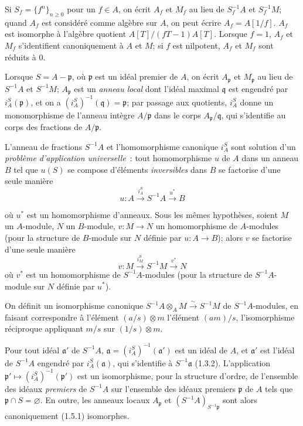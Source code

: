 \begin{env}[1.2.3]
\label{0.1.2.3-fr}
Si $S_f=\{f^n\}_{n\geq 0}$ pour un $f\in A$, on écrit $A_f$ et $M_f$ au lieu de $S_f^{-1}A$ et $S_f^{-1}M$; quand $A_f$ est considéré comme algèbre sur $A$, on peut écrire $A_f=A[1/f]$.
$A_f$ est isomorphe à l'algèbre quotient $A[T]/(fT-1)A[T]$.
Lorsque $f=1$, $A_f$ et $M_f$ s'identifient canoniquement à $A$ et $M$; si $f$ est nilpotent, $A_f$ et $M_f$ sont réduits à $0$.

Lorsque $S=A-\mathfrak{p}$, où $\mathfrak{p}$ est un idéal premier de $A$, on écrit $A_{\mathfrak{p}}$ et $M_{\mathfrak{p}}$ au lieu de $S^{-1}A$ et $S^{-1}M$; $A_{\mathfrak{p}}$ est un \emph{anneau local} dont l'idéal maximal $\mathfrak{q}$ est engendré par $i_A^S(\mathfrak{p})$, et on a $(i_A^S)^{-1}(\mathfrak{q})=\mathfrak{p}$; par passage aux quotients, $i_A^S$ donne un monomorphisme de l'anneau intègre $A/\mathfrak{p}$ dans le corps $A_{\mathfrak{p}}/\mathfrak{q}$, qui s'identifie au corps des fractions de $A/\mathfrak{p}$.
\end{env}

\begin{env}[1.2.4]
\label{0.1.2.4-fr}
L'anneau de fractions $S^{-1}A$ et l'homomorphisme canonique $i_A^S$ sont solution d'un \emph{problème d'application universelle}~: tout homomorphisme $u$ de $A$ dans un anneau $B$ tel que $u(S)$ se compose d'éléments \emph{inversibles} dans $B$ se factorise d'une seule manière
\[
  u:A\xrightarrow{i_A^S}S^{-1}A\xrightarrow{u^*}B
\]

où $u^*$ est un homomorphisme d'anneaux.
Sous les mêmes hypothèses, soient $M$ un $A$-module, $N$ un $B$-module, $v:M\to N$ un homomorphisme de $A$-modules (pour la structure de $B$-module sur $N$ définie par $u:A\to B$); alors $v$ se factorise d'une seule manière
\[
  v:M\xrightarrow{i_M^S}S^{-1}M\xrightarrow{v^*}N
\]
où $v^*$ est un homomorphisme de $S^{-1}A$-modules (pour la structure de $S^{-1}A$-module sur $N$ définie par $u^*$).
\end{env}

\begin{env}[1.2.5]
\label{0.1.2.5-fr}
On définit un isomorphisme canonique $S^{-1}A\otimes_A M\xrightarrow{\sim}S^{-1}M$ de $S^{-1}A$-modules, en faisant correspondre à l'élément $(a/s)\otimes m$ l'élément $(am)/s$, l'isomorphisme réciproque appliquant $m/s$ sur $(1/s)\otimes m$.
\end{env}

\begin{env}[1.2.6]
\label{0.1.2.6-fr}
Pour tout idéal $\mathfrak{a}'$ de $S^{-1}A$, $\mathfrak{a}=(i_A^S)^{-1}(\mathfrak{a}')$ est un idéal de $A$, et $\mathfrak{a}'$ est l'idéal de $S^{-1}A$ engendré par $i_A^S(\mathfrak{a})$, qui s'identifie à $S^{-1}\mathfrak{a}$ (1.3.2).
L'application $\mathfrak{p}'\mapsto(i_A^S)^{-1}(\mathfrak{p}')$ est un isomorphisme, pour la structure d'ordre, de l'ensemble des idéaux \emph{premiers} de $S^{-1}A$ sur l'ensemble des idéaux premiers $\mathfrak{p}$ de $A$ tels que $\mathfrak{p}\cap S=\varnothing$.
En outre, les anneaux locaux $A_{\mathfrak{p}}$ et $(S^{-1}A)_{S^{-1}\mathfrak{p}}$ sont alors canoniquement (1.5.1) isomorphes.
\end{env}

